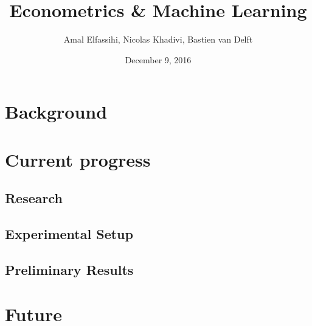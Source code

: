 \documentclass[a4paper]{article}
\begin{document}
\title{Econometrics \& Machine Learning}
\author{Amal Elfassihi, Nicolas Khadivi, Bastien van Delft}
\date{December 9, 2016}
\maketitle

\section{Background}

\section{Current progress}
\subsection{Research}
\subsection{Experimental Setup}
\subsection{Preliminary Results}

\section{Future}
\end{document}
